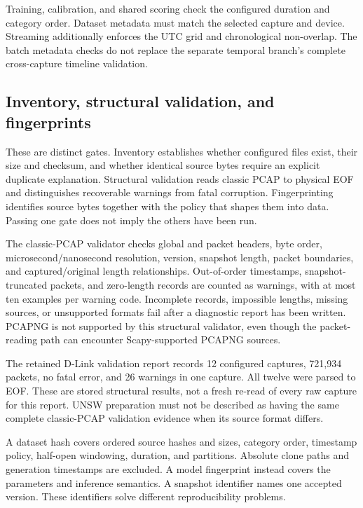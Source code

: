 Training, calibration, and shared scoring check the configured duration and
category order. Dataset metadata must match the selected capture and device.
Streaming additionally enforces the UTC grid and chronological non-overlap.
The batch metadata checks do not replace the separate temporal branch's
complete cross-capture timeline validation.

\subsection{Inventory, structural validation, and fingerprints}

These are distinct gates. Inventory establishes whether configured files exist,
their size and checksum, and whether identical source bytes require an explicit
duplicate explanation. Structural validation reads classic PCAP to physical
EOF and distinguishes recoverable warnings from fatal corruption.
Fingerprinting identifies source bytes together with the policy that shapes
them into data. Passing one gate does not imply the others have been run.

The classic-PCAP validator checks global and packet headers, byte order,
microsecond/nanosecond resolution, version, snapshot length, packet boundaries,
and captured/original length relationships. Out-of-order timestamps,
snapshot-truncated packets, and zero-length records are counted as warnings,
with at most ten examples per warning code. Incomplete records, impossible
lengths, missing sources, or unsupported formats fail after a diagnostic report
has been written. PCAPNG is not supported by this structural validator, even
though the packet-reading path can encounter Scapy-supported PCAPNG sources.

The retained D-Link validation report records 12 configured captures, 721,934
packets, no fatal error, and 26 warnings in one capture. All twelve were parsed
to EOF. These are stored structural results, not a fresh re-read of every raw
capture for this report. UNSW preparation must not be described as having the
same complete classic-PCAP validation evidence when its source format differs.

A dataset hash covers ordered source hashes and sizes, category order, timestamp
policy, half-open windowing, duration, and partitions. Absolute clone paths and
generation timestamps are excluded. A model fingerprint instead covers the
parameters and inference semantics. A snapshot identifier names one accepted
version. These identifiers solve different reproducibility problems.

